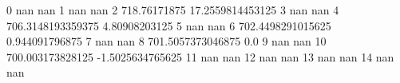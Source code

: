 0 nan nan
1 nan nan
2 718.76171875 17.2559814453125
3 nan nan
4 706.3148193359375 4.80908203125
5 nan nan
6 702.4498291015625 0.944091796875
7 nan nan
8 701.5057373046875 0.0
9 nan nan
10 700.003173828125 -1.5025634765625
11 nan nan
12 nan nan
13 nan nan
14 nan nan
